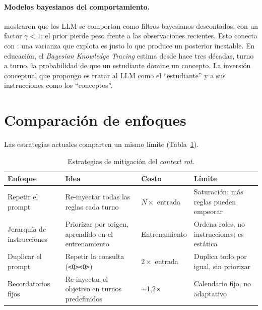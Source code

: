 \documentclass[12pt]{article}
\begin{document}
\paragraph{Modelos bayesianos del comportamiento.} \citet{zhang2025} mostraron que
los LLM se comportan como filtros bayesianos descontados, con un factor
$\gamma<1$: el prior pierde peso frente a las observaciones recientes. Esto conecta
con \citet{laban2025}: una varianza que explota es justo lo que produce un
posterior inestable. En educación, el \emph{Bayesian Knowledge Tracing}
\citep{corbett1994} estima desde hace tres décadas, turno a turno, la probabilidad
de que un estudiante domine un concepto. La inversión conceptual que propongo es
tratar al LLM como el ``estudiante'' y a sus instrucciones como los ``conceptos''.

\section{Comparación de enfoques}

Las estrategias actuales comparten un mismo límite (Tabla~\ref{tab:mitig}).

\begin{table}[h]
  \centering
  \small
  \renewcommand{\arraystretch}{1.15}
  \caption{Estrategias de mitigación del \emph{context rot}.}
  \label{tab:mitig}
  \begin{tabular}{@{}>{\raggedright\arraybackslash}p{2.9cm} >{\raggedright\arraybackslash}p{4.2cm} >{\raggedright\arraybackslash}p{2.15cm} >{\raggedright\arraybackslash}p{3.05cm}@{}}
    \toprule
    \textbf{Enfoque} & \textbf{Idea} & \textbf{Costo} & \textbf{Límite} \\
    \midrule
    Repetir el prompt & Re-inyectar todas las reglas cada turno & $N\times$ entrada & Saturación: más reglas pueden empeorar \citep{mu2025} \\
    Jerarquía de instrucciones \citep{wallace2024} & Priorizar por origen, aprendido en el entrenamiento & Entrenamiento & Ordena roles, no instrucciones; es estática \\
    Duplicar el prompt \citep{leviathan2025} & Repetir la consulta (\texttt{<Q><Q>}) & $2\times$ entrada & Duplica todo por igual, sin priorizar \\
    Recordatorios fijos \citep{dongre2025} & Re-inyectar el objetivo en turnos predefinidos & $\sim$1,2$\times$ & Calendario fijo, no adaptativo \\
    \bottomrule
  \end{tabular}
\end{table}
\end{document}
